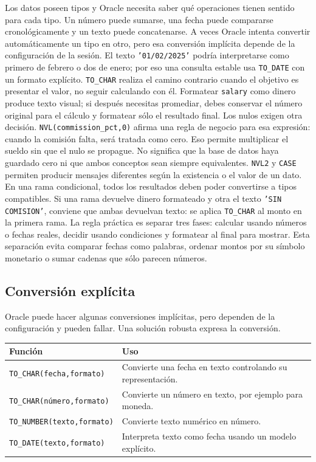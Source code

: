 \documentclass[11pt,a4paper]{article}
\newcommand{\campo}[1]{\texttt{#1}}
\begin{document}
Los datos poseen tipos y Oracle necesita saber qué operaciones tienen sentido para cada tipo. Un
número puede sumarse, una fecha puede compararse cronológicamente y un texto puede concatenarse. A
veces Oracle intenta convertir automáticamente un tipo en otro, pero esa conversión implícita depende
de la configuración de la sesión. El texto \campo{'01/02/2025'} podría interpretarse como primero de
febrero o dos de enero; por eso una consulta estable usa \campo{TO_DATE} con un formato explícito.
\campo{TO_CHAR} realiza el camino contrario cuando el objetivo es presentar el valor, no seguir
calculando con él. Formatear \campo{salary} como dinero produce texto visual; si después necesitas
promediar, debes conservar el número original para el cálculo y formatear sólo el resultado final. Los
nulos exigen otra decisión. \campo{NVL(commission_pct,0)} afirma una regla de negocio para esa
expresión: cuando la comisión falta, será tratada como cero. Eso permite multiplicar el sueldo sin que
el nulo se propague. No significa que la base de datos haya guardado cero ni que ambos conceptos sean
siempre equivalentes. \campo{NVL2} y \campo{CASE} permiten producir mensajes diferentes según la
existencia o el valor de un dato. En una rama condicional, todos los resultados deben poder convertirse
a tipos compatibles. Si una rama devuelve dinero formateado y otra el texto \campo{'SIN COMISION'},
conviene que ambas devuelvan texto: se aplica \campo{TO_CHAR} al monto en la primera rama. La regla
práctica es separar tres fases: calcular usando números o fechas reales, decidir usando condiciones y
formatear al final para mostrar. Esta separación evita comparar fechas como palabras, ordenar montos
por su símbolo monetario o sumar cadenas que sólo parecen números.

\subsection{Conversión explícita}

Oracle puede hacer algunas conversiones implícitas, pero dependen de la configuración y pueden
fallar. Una solución robusta expresa la conversión.

\begin{longtable}{p{} p{}}
\toprule
\textbf{Función} & \textbf{Uso} \\
\midrule
\endhead
\campo{TO\_CHAR(fecha,formato)} & Convierte una fecha en texto controlando su representación. \\
\campo{TO\_CHAR(número,formato)} & Convierte un número en texto, por ejemplo para moneda. \\
\campo{TO\_NUMBER(texto,formato)} & Convierte texto numérico en número. \\
\campo{TO\_DATE(texto,formato)} & Interpreta texto como fecha usando un modelo explícito. \\
\bottomrule
\end{longtable}
\end{document}
